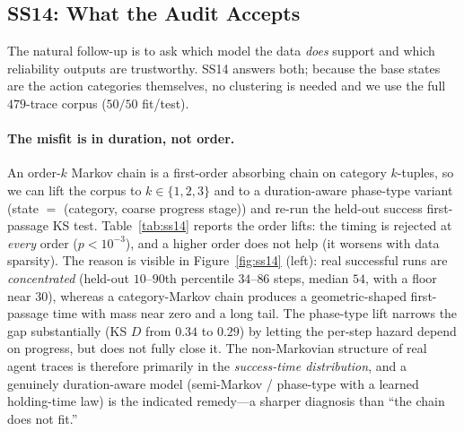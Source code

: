 \subsection{SS14: What the Audit Accepts}
\label{sec:ss14}

The natural follow-up is to ask which model the data \emph{does} support and
which reliability outputs are trustworthy. SS14 answers both; because the base
states are the action categories themselves, no clustering is needed and we use
the full $479$-trace corpus ($50/50$ fit/test).

\paragraph{The misfit is in duration, not order.}
An order-$k$ Markov chain is a first-order absorbing chain on category
$k$-tuples, so we can lift the corpus to $k\in\{1,2,3\}$ and to a duration-aware
phase-type variant (state $=$ (category, coarse progress stage)) and re-run the
held-out success first-passage KS test. Table~\ref{tab:ss14} reports the order
lifts: the timing is rejected at \emph{every} order ($p<10^{-3}$), and a
higher order does not help (it worsens with data sparsity). The reason is
visible in Figure~\ref{fig:ss14} (left): real successful runs are
\emph{concentrated} (held-out $10$--$90$th percentile $34$--$86$ steps, median
$54$, with a floor near $30$), whereas a category-Markov chain produces a
geometric-shaped first-passage time with mass near zero and a long tail. The
phase-type lift narrows the gap substantially (KS $D$ from $0.34$ to $0.29$)
by letting the per-step hazard depend on progress, but does not fully close it.
The non-Markovian structure of real agent traces is therefore primarily in the
\emph{success-time distribution}, and a genuinely duration-aware model
(semi-Markov / phase-type with a learned holding-time law) is the indicated
remedy---a sharper diagnosis than ``the chain does not fit.''



